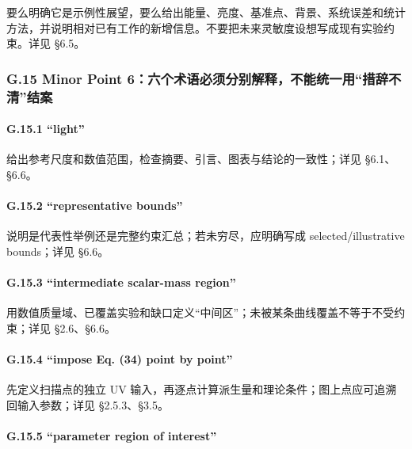 \documentclass[
]{article}
\begin{document}
要么明确它是示例性展望，要么给出能量、亮度、基准点、背景、系统误差和统计方法，并说明相对已有工作的新增信息。不要把未来灵敏度设想写成现有实验约束。详见
§6.5。

\subsubsection{G.15 Minor Point
6：六个术语必须分别解释，不能统一用``措辞不清''结案}\label{g.15-minor-point-6ux516dux4e2aux672fux8bedux5fc5ux987bux5206ux522bux89e3ux91caux4e0dux80fdux7edfux4e00ux7528ux63aaux8f9eux4e0dux6e05ux7ed3ux6848}

\paragraph{G.15.1 ``light''}\label{g.15.1-light}

给出参考尺度和数值范围，检查摘要、引言、图表与结论的一致性；详见
§6.1、§6.6。

\paragraph{G.15.2 ``representative
bounds''}\label{g.15.2-representative-bounds}

说明是代表性举例还是完整约束汇总；若未穷尽，应明确写成
selected/illustrative bounds；详见 §6.6。

\paragraph{G.15.3 ``intermediate scalar-mass
region''}\label{g.15.3-intermediate-scalar-mass-region}

用数值质量域、已覆盖实验和缺口定义``中间区''；未被某条曲线覆盖不等于不受约束；详见
§2.6、§6.6。

\paragraph{G.15.4 ``impose Eq. (34) point by
point''}\label{g.15.4-impose-eq.-34-point-by-point}

先定义扫描点的独立 UV
输入，再逐点计算派生量和理论条件；图上点应可追溯回输入参数；详见
§2.5.3、§3.5。

\paragraph{G.15.5 ``parameter region of
interest''}\label{g.15.5-parameter-region-of-interest}
\end{document}
